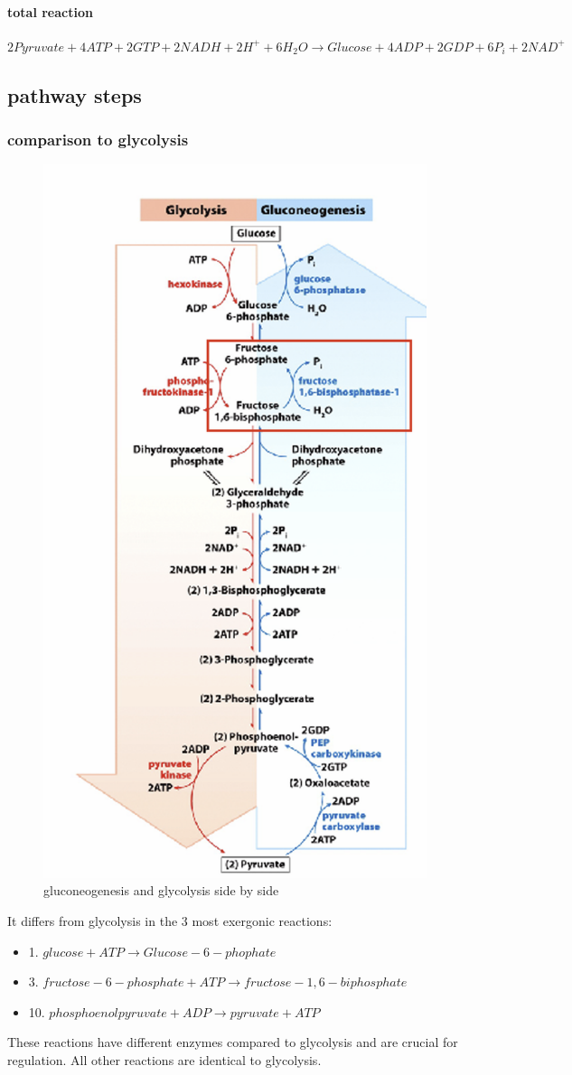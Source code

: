\documentclass[../main.tex]{subfiles}
\begin{document}
\paragraph{total reaction}
$2 Pyruvate + 4 ATP + 2 GTP + 2 NADH + 2 H^{+} + 6 H_2O \rightarrow 
Glucose + 4 ADP + 2 GDP + 6 P_i + 2 NAD^{+}$

\subsection{pathway steps}
\subsubsection{comparison to glycolysis}
\begin{figure}[H]
    \centering
    \includegraphics[width=0.5\linewidth]{GlycolysisComparison.png}
    \caption{gluconeogenesis and glycolysis side by side}
    \label{fig:enter-label}
\end{figure}
It differs from glycolysis in the 3 most exergonic reactions:
\begin{itemize}
    \item 1. $glucose + ATP \rightarrow Glucose-6-phophate$
    \item 3. $ fructose-6-phosphate + ATP \rightarrow fructose-1,6-biphosphate$
    \item 10. $ phosphoenolpyruvate + ADP \rightarrow pyruvate + ATP$
\end{itemize}
These reactions have different enzymes compared to glycolysis and are crucial for regulation. All other reactions are identical to glycolysis. 
\end{document}

